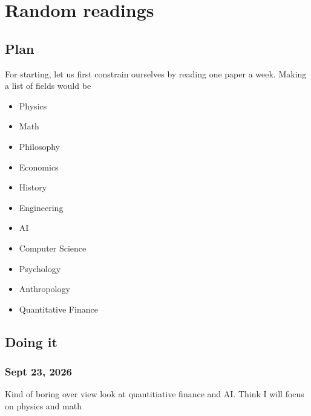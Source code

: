 \chapter{Random readings}

\section{Plan}
For starting, let us first constrain ourselves by reading one paper a week. Making a list of fields would be
\begin{itemize}
  \item Physics
  \item Math
  \item Philosophy
  \item Economics
  \item History
  \item Engineering
  \item AI
  \item Computer Science
  \item Psychology
  \item Anthropology
  \item Quantitative Finance
\end{itemize}

\section{Doing it}

\subsection{Sept 23, 2026}

Kind of boring over view look at quantitiative finance and AI. Think I will focus on physics and math
